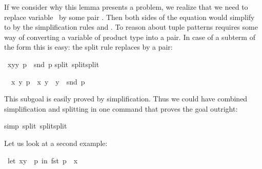 \begin{isabellebody}
\begin{isamarkuptext}
If we consider why this lemma presents a problem, 
we realize that we need to replace variable~ by some pair .  Then both sides of the
equation would simplify to  by the simplification rules
 and .  
To reason about tuple patterns requires some way of
converting a variable of product type into a pair.
In case of a subterm of the form  this is easy: the split
rule  replaces  by a pair:%
%
\end{isamarkuptext}%
\isamarkuptrue%
\isamarkupfalse%
\ {\isachardoublequoteopen}{\isacharparenleft}{\isasymlambda}{\isacharparenleft}x{\isacharcomma}y{\isacharparenright}{\isachardot}y{\isacharparenright}\ p\ {\isacharequal}\ snd\ p{\isachardoublequoteclose}\isanewline
%
\isadelimproof
%
\endisadelimproof
%
\isatagproof
{}\isamarkupfalse%
{\isacharparenleft}split\ split{\isacharunderscore}split{\isacharparenright}%
\begin{isamarkuptxt}%
\begin{isabelle}%
\ {}{\isachardot}\ {\isasymforall}x\ y{\isachardot}\ p\ {\isacharequal}\ {\isacharparenleft}x{\isacharcomma}\ y{\isacharparenright}\ {\isasymlongrightarrow}\ y\ {\isacharequal}\ snd\ p%
\end{isabelle}
This subgoal is easily proved by simplification. Thus we could have combined
simplification and splitting in one command that proves the goal outright:%
\end{isamarkuptxt}%
\isamarkuptrue%
%
\endisatagproof
{\isafoldproof}%
%
\isadelimproof
%
\endisadelimproof
%
\isadelimproof
%
\endisadelimproof
%
\isatagproof
{}\isamarkupfalse%
{\isacharparenleft}simp\ split{\isacharcolon}\ split{\isacharunderscore}split{\isacharparenright}%
\endisatagproof
{\isafoldproof}%
%
\isadelimproof
%
\endisadelimproof
%
\begin{isamarkuptext}%
Let us look at a second example:%
\end{isamarkuptext}%
\isamarkuptrue%
\isamarkupfalse%
\ {\isachardoublequoteopen}let\ {\isacharparenleft}x{\isacharcomma}y{\isacharparenright}\ {\isacharequal}\ p\ in\ fst\ p\ {\isacharequal}\ x{\isachardoublequoteclose}\isanewline
%
\isadelimproof
%
\endisadelimproof
%
\isatagproof

\end{isabellebody}
